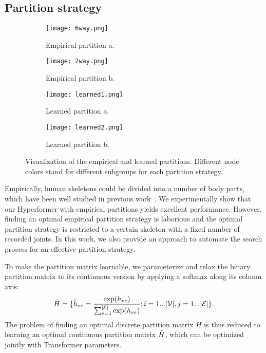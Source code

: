 \documentclass[10pt,twocolumn,letterpaper]{article}
\begin{document}
\subsection{Partition strategy}
\label{sec:learn}

\begin{figure}[]
  \centering
\begin{subfigure}[t]{0.18\textwidth}
      \centering
      \texttt{[image: 6way.png]}
      \caption{Empirical partition a.}
      \label{fig: 2}
  \end{subfigure}
\hspace{1.5cm}
  \begin{subfigure}[t]{0.18\textwidth}
      \centering
      \texttt{[image: 2way.png]}
      \caption{Empirical partition b.}
      \label{fig:3}
  \end{subfigure}
  \hspace{0.6cm}
\begin{subfigure}[t]{0.18\textwidth}
      \centering
  \texttt{[image: learned1.png]}
      \caption{Learned partition a.}
      \label{fig:4}
  \end{subfigure}
        \hspace{1.5cm}
  \begin{subfigure}[t]{0.18\textwidth}
      \centering
  \texttt{[image: learned2.png]}
      \caption{Learned  partition b.}
      \label{fig:leg}
  \end{subfigure}
     \caption{Visualization of the empirical and learned partitions. Different node colors stand for different subgroups for each partition strategy.}
     \label{fig:2}
\end{figure}

Empirically, human skeletons could be divided into a number of body parts, which have been well studied in previous work~\cite{thakkar2018part, huang2020part, song2020stronger}.
We experimentally show that our Hyperformer with empirical partitions yields excellent performance. 
However, finding an optimal empirical partition strategy is laborious and the optimal partition strategy is restricted to a certain skeleton with a fixed number of recorded joints. In this work, we also provide an approach to automate the search process for an effective partition strategy.


To make the partition matrix learnable, we parameterize and relax the binary partition matrix to its continuous version by applying a softmax along its column axis:
\begin{equation}
    \Tilde{H} = \{ \Tilde{h}_{ve} = \frac{{\rm exp} (h_{ve})} {\sum^{\vert \mathcal{E}\vert}_{e=1} {\rm exp} (h_{ve})}; i=1...\vert \mathcal{V} \vert, j=1...\vert \mathcal{E} \vert \}.
\end{equation}
The problem of finding an optimal discrete partition matrix $H$ is thus reduced to learning an optimal continuous partition matrix $\Tilde{H}$, which can be optimized jointly with Transformer parameters. 
\end{document}
